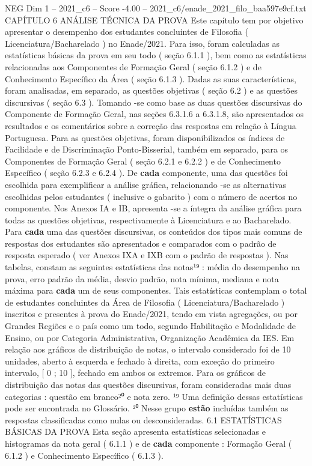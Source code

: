 \begin{textsample}{NEG Dim 1 – 2021\_c6 – Score -4.00 – 2021\_c6/enade\_2021\_filo\_baa597e9cf.txt}  \label{ex:f1_neg_234}
CAPÍTULO 6 ANÁLISE TÉCNICA DA PROVA Este capítulo tem por objetivo apresentar o desempenho dos estudantes concluintes de Filosofia ( Licenciatura/Bacharelado ) no Enade/2021.
Para isso, foram calculadas as estatísticas básicas da prova em seu todo ( seção 6.1.1 ), bem como as estatísticas relacionadas aos Componentes de Formação Geral ( seção 6.1.2 ) e de Conhecimento Específico da Área ( seção 6.1.3 ).
Dadas as suas características, foram analisadas, em separado, as questões objetivas ( seção 6.2 ) e as questões discursivas ( seção 6.3 ).
Tomando -se como base as duas questões discursivas do Componente de Formação Geral, nas seções 6.3.1.6 a 6.3.1.8, são apresentados os resultados e os comentários sobre a correção das respostas em relação à Língua Portuguesa.
Para as questões objetivas, foram disponibilizados os índices de Facilidade e de Discriminação Ponto-Bisserial, também em separado, para os Componentes de Formação Geral ( seção 6.2.1 e 6.2.2 ) e de Conhecimento Específico ( seção 6.2.3 e 6.2.4 ).
De \textbf{cada} componente, uma das questões foi escolhida para exemplificar a análise gráfica, relacionando -se as alternativas escolhidas pelos estudantes ( inclusive o gabarito ) com o número de acertos no componente.
Nos Anexos IA e IB, apresenta -se a íntegra da análise gráfica para todas as questões objetivas, respectivamente à Licenciatura e ao Bacharelado.
Para \textbf{cada} uma das questões discursivas, os conteúdos dos tipos mais comuns de respostas dos estudantes são apresentados e comparados com o padrão de resposta esperado ( ver Anexos IXA e IXB com o padrão de respostas ).
Nas tabelas, constam as seguintes estatísticas das notas¹⁹ : média do desempenho na prova, erro padrão da média, desvio padrão, nota mínima, mediana e nota máxima para \textbf{cada} um de seus componentes.
Tais estatísticas contemplam o total de estudantes concluintes da Área de Filosofia ( Licenciatura/Bacharelado ) inscritos e presentes à prova do Enade/2021, tendo em vista agregações, ou por Grandes Regiões e o país como um todo, segundo Habilitação e Modalidade de Ensino, ou por Categoria Administrativa, Organização Acadêmica da IES.
Em relação aos gráficos de distribuição de notas, o intervalo considerado foi de 10 unidades, aberto à esquerda e fechado à direita, com exceção do primeiro intervalo, [ 0 ; 10 ], fechado em ambos os extremos.
Para os gráficos de distribuição das notas das questões discursivas, foram consideradas mais duas categorias : questão em branco²⁰ e nota zero. ¹⁹ Uma definição dessas estatísticas pode ser encontrada no Glossário. ²⁰ Nesse grupo \textbf{estão} incluídas também as respostas classificadas como nulas ou desconsideradas. 6.1 ESTATÍSTICAS BÁSICAS DA PROVA Esta seção apresenta estatísticas selecionadas e histogramas da nota geral ( 6.1.1 ) e de \textbf{cada} componente : Formação Geral ( 6.1.2 ) e Conhecimento Específico ( 6.1.3 ).

\end{textsample}
